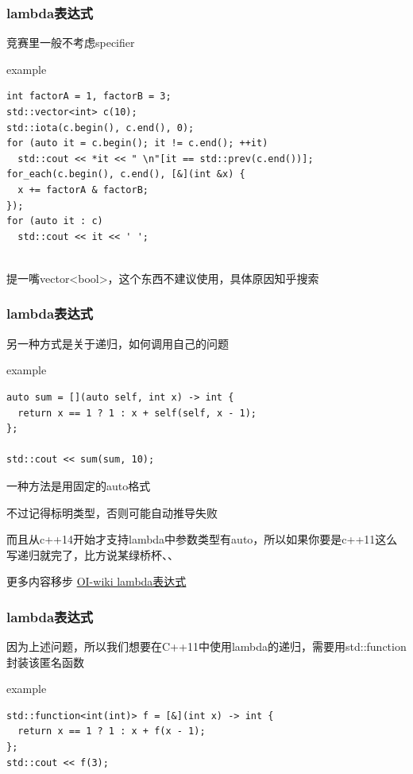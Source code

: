 \documentclass{beamer}
\begin{document}
  \begin{frame}[fragile]
    \frametitle{lambda表达式}
    竞赛里一般不考虑specifier

    \begin{block}{example}
      \begin{lstlisting}
int factorA = 1, factorB = 3;
std::vector<int> c(10);
std::iota(c.begin(), c.end(), 0);
for (auto it = c.begin(); it != c.end(); ++it)
  std::cout << *it << " \n"[it == std::prev(c.end())];
for_each(c.begin(), c.end(), [&](int &x) {
  x += factorA & factorB;
});
for (auto it : c)
  std::cout << it << ' ';
        
      \end{lstlisting}

    \end{block}

    提一嘴vector<bool>，这个东西不建议使用，具体原因知乎搜索
  \end{frame}

  \begin{frame}[fragile]
    \frametitle{lambda表达式}
    另一种方式是关于递归，如何调用自己的问题
    \begin{block}{example}
      \begin{lstlisting}
auto sum = [](auto self, int x) -> int {
  return x == 1 ? 1 : x + self(self, x - 1);
};

std::cout << sum(sum, 10);
      \end{lstlisting}

      一种方法是用固定的auto格式
      
      不过记得标明类型，否则可能自动推导失败

      而且从c++14开始才支持lambda中参数类型有auto，所以如果你要是c++11这么写递归就完了，比方说某绿桥杯、、
    \end{block}

    更多内容移步 \href{https://oi-wiki.org/lang/lambda}{OI-wiki lambda表达式}
  \end{frame}

  \begin{frame}[fragile]
    \frametitle{lambda表达式}

    因为上述问题，所以我们想要在C++11中使用lambda的递归，需要用std::function封装该匿名函数

    \begin{block}{example}
      \begin{lstlisting}
std::function<int(int)> f = [&](int x) -> int {
  return x == 1 ? 1 : x + f(x - 1);
};
std::cout << f(3);
      \end{lstlisting}      
    \end{block}
  \end{frame}
\end{document}
